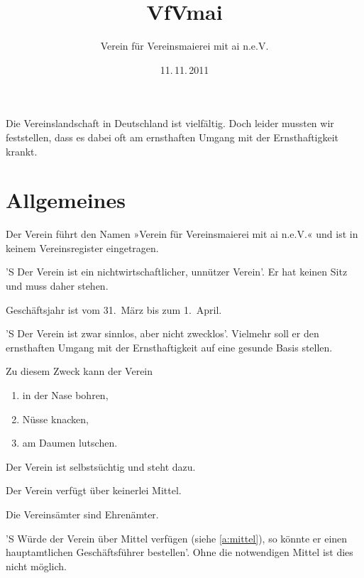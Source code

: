 \documentclass[fontsize=12pt,pagesize,parskip=half]
              {scrartcl}
\begin{document}
\subject{Satzung}
\title{VfVmai}
\subtitle{Verein für Vereinsmaierei mit ai n.e.V.}
\date{11.\,11.\,2011}
\maketitle

\tableofcontents


Die Vereinslandschaft in Deutschland ist vielfältig.
Doch leider mussten wir feststellen, dass es dabei oft
am ernsthaften Umgang mit der Ernsthaftigkeit krankt.

\appendix

\section{Allgemeines}

\begin{contract}

Der Verein führt den Namen »Verein für Vereinsmaierei mit 
ai n.e.V.« und ist in keinem Vereinsregister eingetragen.

'S Der Verein ist ein nichtwirtschaftlicher, unnützer
Verein'. Er hat keinen Sitz und muss daher stehen.

Geschäftsjahr ist vom 31.~März bis zum 1.~April.


'S Der Verein ist zwar sinnlos, aber nicht zwecklos'.
Vielmehr soll er den ernsthaften Umgang mit der
Ernsthaftigkeit auf eine gesunde Basis stellen.

Zu diesem Zweck kann der Verein
\begin{enumerate}[\qquad a)]
\item in der Nase bohren,
\item Nüsse knacken,
\item am Daumen lutschen.
\end{enumerate}

Der Verein ist selbstsüchtig und steht dazu.

Der Verein verfügt über keinerlei Mittel.\label{a:mittel}


Die Vereinsämter sind Ehrenämter.

'S Würde der Verein über Mittel verfügen 
(siehe \ref{a:mittel}), so könnte er einen
hauptamtlichen Geschäftsführer bestellen'. Ohne
die notwendigen Mittel ist dies nicht möglich.

\label{p.maier}
\end{contract}
\end{document}
